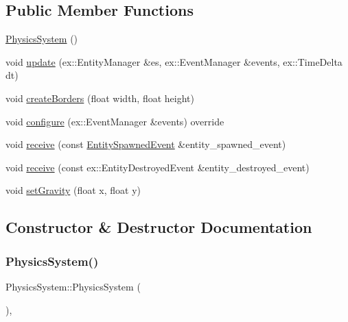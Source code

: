 \subsection*{Public Member Functions}
\begin{DoxyCompactItemize}
\item 
\hyperlink{classPhysicsSystem_a4960fbd046fb332a5faa36fb5028e7c5}{Physics\+System} ()
\item 
void \hyperlink{classPhysicsSystem_a4e3674b18191bada7b4b79c5a4dcf5e2}{update} (ex\+::\+Entity\+Manager \&es, ex\+::\+Event\+Manager \&events, ex\+::\+Time\+Delta dt)
\item 
void \hyperlink{classPhysicsSystem_a8b42dc0a70e6da85e7dccad9897fd61c}{create\+Borders} (float width, float height)
\item 
void \hyperlink{classPhysicsSystem_ad5fb8504ea04b8a40146ddcb25f58861}{configure} (ex\+::\+Event\+Manager \&events) override
\item 
void \hyperlink{classPhysicsSystem_a41b6f92145e580bc80e903b13b6dfaa3}{receive} (const \hyperlink{classEntitySpawnedEvent}{Entity\+Spawned\+Event} \&entity\+\_\+spawned\+\_\+event)
\item 
void \hyperlink{classPhysicsSystem_ac7e8c1e5a616b42189de4605e4b6a687}{receive} (const ex\+::\+Entity\+Destroyed\+Event \&entity\+\_\+destroyed\+\_\+event)
\item 
void \hyperlink{classPhysicsSystem_a01fa32b7faab08192ae96e4520b8765a}{set\+Gravity} (float x, float y)
\end{DoxyCompactItemize}


\subsection{Constructor \& Destructor Documentation}
\mbox{\label{classPhysicsSystem_a4960fbd046fb332a5faa36fb5028e7c5}} 
\subsubsection{\texorpdfstring{Physics\+System()}{PhysicsSystem()}}
{\footnotesize\ttfamily Physics\+System\+::\+Physics\+System (\begin{DoxyParamCaption}{ }\end{DoxyParamCaption})\hspace{0.3cm}{\ttfamily [inline]}, {\ttfamily [explicit]}}



